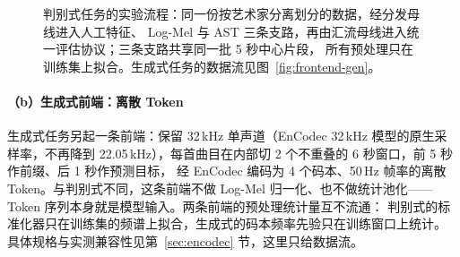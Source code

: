 \documentclass[UTF8,10pt,a4paper]{ctexart}
\begin{document}
\begin{figure}[H]
{}
  \caption{判别式任务的实验流程：同一份按艺术家分离划分的数据，经分发母线进入人工特征、
  Log-Mel 与 AST 三条支路，再由汇流母线进入统一评估协议；三条支路共享同一批 5 秒中心片段，
  所有预处理只在训练集上拟合。生成式任务的数据流见图~\ref{fig:frontend-gen}。}
  \label{fig:pipeline}
\end{figure}


\paragraph{（b）生成式前端：离散 Token}
生成式任务另起一条前端：保留 32\,kHz 单声道（EnCodec 32\,kHz 模型的原生采样率，不再降到
22.05\,kHz），每首曲目在内部切 2 个不重叠的 6 秒窗口，前 5 秒作前缀、后 1 秒作预测目标，
经 EnCodec 编码为 4 个码本、50\,Hz 帧率的离散 Token。与判别式不同，这条前端不做 Log-Mel
归一化、也不做统计池化——Token 序列本身就是模型输入。两条前端的预处理统计量互不流通：
判别式的标准化器只在训练集的频谱上拟合，生成式的码本频率先验只在训练窗口上统计。
具体规格与实测兼容性见第~\ref{sec:encodec} 节，这里只给数据流。
\end{document}
